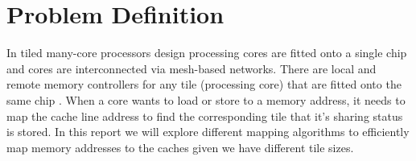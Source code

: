 \section{Problem Definition}
\label{sec:problem}
In tiled many-core processors design processing cores are fitted onto a single chip and cores are interconnected via mesh-based networks. There are local and remote memory controllers for any tile (processing core) that are fitted onto the same chip \cite{tiled-manycore}. When a core wants to load or store to a memory address, it needs to map the cache line address to find the corresponding tile that it's sharing status is stored. In this report we will explore different mapping algorithms to efficiently map memory addresses to the caches given we have different tile sizes. 

